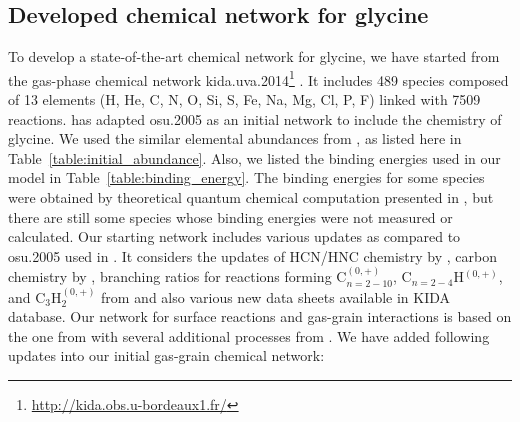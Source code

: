 \documentclass{aastex61}
\begin{document}
\subsection{Developed chemical network for glycine}
To develop a state-of-the-art chemical network for glycine, we have started from the gas-phase chemical network kida.uva.2014\footnote{\url{http://kida.obs.u-bordeaux1.fr/}} \citep{Wakelam15}. 
%
It includes 489 species composed of 13 elements (H, He, C, N, O, Si, S, Fe, Na, Mg, Cl, P, F) linked with 7509 reactions. \cite{Garrod13} has adapted osu.2005 as an initial network to include the chemistry of glycine.
%
We used the similar elemental abundances from \cite{Garrod13}, as listed here in Table~\ref{table:initial_abundance}.
%
Also, we listed the binding energies used in our model in Table~\ref{table:binding_energy}.
%
The binding energies for some species were obtained by theoretical quantum chemical computation presented in \cite{Wakelam17}, but there are still some species whose binding energies were not measured or calculated.
%
Our starting network includes various updates as compared to osu.2005 used in \cite{Garrod13}. It considers the updates of HCN/HNC chemistry by \cite{Loison14b}, carbon chemistry by \cite{Loison14a}, branching ratios for reactions forming C$_{n=2-10}^{(0,+)}$, C$_{n = 2- 4}$H$^{(0, +)}$, and C$_3$H$_2^{(0,+)}$ from \cite{Chabot13} and also various new data sheets available in KIDA database.
%
Our network for surface reactions and gas-grain interactions is based on the one from \cite{Garrod07} with several additional 
processes from \cite{Ruaud15}. We have added following updates into our initial gas-grain chemical network: 
\end{document}
